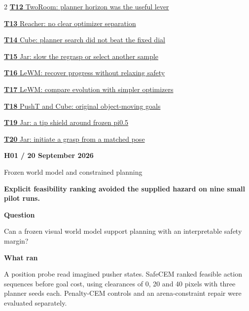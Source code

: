 \documentclass[11pt,a4paper]{article}
\newcommand{\block}[2]{\par\textbf{\color{ink}#1}\par\nopagebreak #2\par}
\newcommand{\finding}[1]{\begin{tcolorbox}[colback=pale,colframe=pale,boxrule=0pt,arc=1mm,left=10pt,right=10pt,top=10pt,bottom=10pt]\color{ink}\large\bfseries #1\end{tcolorbox}}
\begin{document}
\begin{multicols}{2}
\noindent\hyperref[exp:T12]{\textbf{T12} TwoRoom: planner horizon was the useful lever}\par\vspace{5pt}
\noindent\hyperref[exp:T13]{\textbf{T13} Reacher: no clear optimizer separation}\par\vspace{5pt}
\noindent\hyperref[exp:T14]{\textbf{T14} Cube: planner search did not beat the fixed dial}\par\vspace{5pt}
\noindent\hyperref[exp:T15]{\textbf{T15} Jar: slow the regrasp or select another sample}\par\vspace{5pt}
\noindent\hyperref[exp:T16]{\textbf{T16} LeWM: recover progress without relaxing safety}\par\vspace{5pt}
\noindent\hyperref[exp:T17]{\textbf{T17} LeWM: compare evolution with simpler optimizers}\par\vspace{5pt}
\noindent\hyperref[exp:T18]{\textbf{T18} PushT and Cube: original object-moving goals}\par\vspace{5pt}
\noindent\hyperref[exp:T19]{\textbf{T19} Jar: a tip shield around frozen pi0.5}\par\vspace{5pt}
\noindent\hyperref[exp:T20]{\textbf{T20} Jar: initiate a grasp from a matched pose}\par\vspace{5pt}
\end{multicols}\clearpage
{}\label{exp:H01}
{\color{accent}\small\bfseries H01 / 20 September 2026}\par
{}\par
{\color{muted}\small Frozen world model and constrained planning}\par\vspace{2mm}
\finding{Explicit feasibility ranking avoided the supplied hazard on nine small pilot runs.}
\block{Question}{Can a frozen visual world model support planning with an interpretable safety margin?}
\block{What ran}{A position probe read imagined pusher states. SafeCEM ranked feasible action sequences before goal cost, using clearances of 0, 20 and 40 pixels with three planner seeds each. Penalty-CEM controls and an arena-constraint repair were evaluated separately.}
\end{document}
